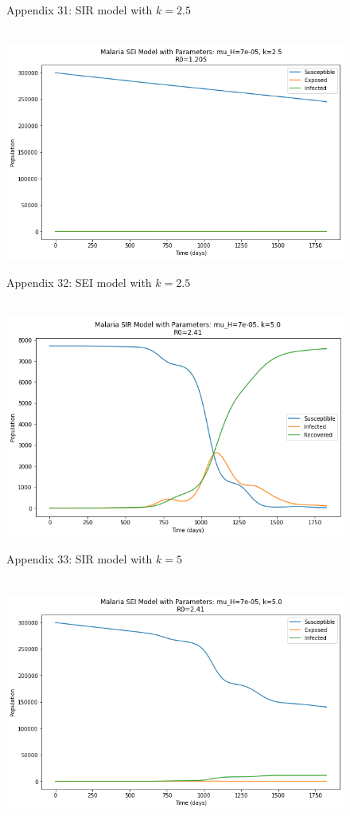 \documentclass[
	12pt,				%
	oneside,			%
	a4paper,			%
	english,			%
	brazil				%
	]{abntex2}
\begin{document}
\begin{apendicesenv}
\begin{figure}[!ht]
	\caption*{Appendix 31: SIR model with $k=2.5$}
\end{figure} 
\begin{figure}[!ht]
	\centering
	\hbox{\hspace{3.0em} \includegraphics[scale=0.6] {THESIS-SEI_k_2_5.png}}
	\caption*{Appendix 32: SEI model with $k=2.5$}
\end{figure}
\newpage
\begin{figure}[!ht]
	\centering
	\hbox{\hspace{3.0em} \includegraphics[scale=0.6] {THESIS-SIR_k_5.png}}
	\caption*{Appendix 33: SIR model with $k=5$}
\end{figure} 
\begin{figure}[!ht]
	\centering
	\hbox{\hspace{3.0em} \includegraphics[scale=0.6] {THESIS-SEI_k_5.png}}

\end{figure}
\end{apendicesenv}
\end{document}
